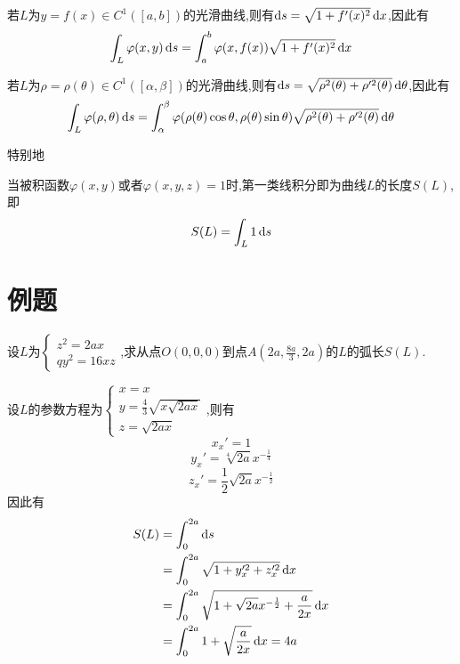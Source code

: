 \begin{corollary}
    若$L$为$y=f(x) \in C^1([a,b])$的光滑曲线,则有$\operatorname{d\!} s = \sqrt{1 + f'(x)^2} \operatorname{d\!} x$,因此有
$$\int_L \varphi(x,y) \operatorname{d\!} s = \int_a^b \varphi(x,f(x)) \sqrt{1 + f'(x)^2} \operatorname{d\!} x$$

若$L$为$\rho = \rho(\theta) \in C^1([\alpha,\beta])$的光滑曲线,则有$\operatorname{d\!} s = \sqrt{\rho^2(\theta) + \rho'^2(\theta)} \operatorname{d\!} \theta$,因此有
$$\int_L \varphi(\rho,\theta) \operatorname{d\!} s = \int_\alpha^\beta \varphi(\rho(\theta)\cos \theta,\rho(\theta)\sin \theta) \sqrt{\rho^2(\theta) + \rho'^2(\theta)} \operatorname{d\!} \theta$$
\end{corollary}

特别地
\begin{corollary}
    当被积函数$\varphi(x,y)$或者$\varphi(x,y,z) = 1$时,第一类线积分即为曲线$L$的长度$S(L)$,即
$$S(L) = \int_L 1 \operatorname{d\!} s$$
\end{corollary}

\section{例题}

\begin{example}
    设$L$为$\begin{cases}
        z^2 = 2ax \\
        qy^2 = 16xz
    \end{cases}$,求从点$O(0,0,0)$到点$A(2a, \frac{8a}{3},2a)$的$L$的弧长$S(L)$.
\end{example}

\begin{solution}
设$L$的参数方程为$\begin{cases}
    x = x \\
    y = \frac{4}{3} \sqrt{x \sqrt{2ax}}\\
    z = \sqrt{2ax}
\end{cases}$,则有
$$x_x' = 1$$
$$y_x' = \sqrt[4]{2a} x^{-\frac{1}{4}}$$
$$z_x' = \frac{1}{2} \sqrt{2a} x^{-\frac{1}{2}}$$
因此有
\begin{align*}
S(L) &= \int_0^{2a} \operatorname{d\!} s\\
&=\int_0^{2a} \sqrt{1 + y_x'^2 + z_x'^2} \operatorname{d\!} x\\
&= \int_0^{2a} \sqrt{1 + \sqrt{2a}x^{-\frac{1}{2}} + \frac{a}{2x}} \operatorname{d\!} x\\
&= \int_0^{2a} 1 + \sqrt{\frac{a}{2x}} \operatorname{d\!} x = 4a
\end{align*}
\end{solution}


